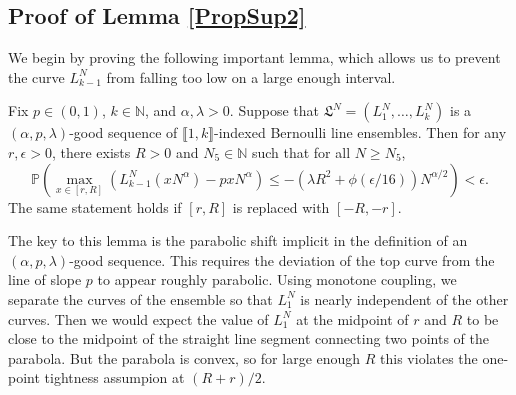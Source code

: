 \subsection{Proof of Lemma \ref{PropSup2}}\label{Section5.2}

	We begin by proving the following important lemma, which allows us to prevent the curve $L_{k-1}^N$ from falling too low on a large enough interval.
	
	\begin{lemma}\label{21}
		Fix $p\in (0,1)$, $k\in\mathbb{N}$, and $\alpha,\lambda > 0$. Suppose that $\mathfrak{L}^N = (L_1^N, \dots, L_k^N)$ is a $(\alpha,p,\lambda)$-good sequence of $\llbracket 1, k\rrbracket$-indexed Bernoulli line ensembles. Then for any $r,\epsilon>0$, there exists $R>0$ and $N_5 \in \mathbb{N}$ such that for all $N\geq N_5$,
		\[
		\mathbb{P}\left(\max_{x\in[r,R]} \left(L_{k-1}^N(xN^\alpha) - pxN^\alpha\right) \leq -(\lambda R^2 + \phi(\epsilon/16))N^{\alpha/2}\right) < \epsilon.
		\]
		The same statement holds if $[r,R]$ is replaced with $[-R,-r]$.
	\end{lemma}

	\begin{remark}
		The key to this lemma is the parabolic shift implicit in the definition of an $(\alpha,p,\lambda)$-good sequence. This requires the deviation of the top curve from the line of slope $p$ to appear roughly parabolic. Using monotone coupling, we separate the curves of the ensemble so that $L_1^N$ is nearly independent of the other curves. Then we would expect the value of $L_1^N$ at the midpoint of $r$ and $R$ to be close to the midpoint of the straight line segment connecting two points of the parabola. But the parabola is convex, so for large enough $R$ this violates the one-point tightness assumpion at $(R+r)/2$.
	\end{remark}
	
